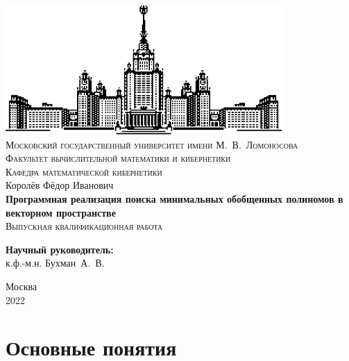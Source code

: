 \documentclass[a4paper,12pt,titlepage]{article}
\begin{document}
\hypersetup{pageanchor=false}
\begin{titlepage}
    \begin{center}
        \includegraphics{logo.pdf} \\
        \textsc{\small Московский государственный университет имени М.~В.~Ломоносова \\
        Факультет вычислительной математики и кибернетики \\
        Кафедра математической кибернетики \\}
        \vfill
        \large{Королёв Фёдор Иванович} \\
        \vspace{1cm}
        \textbf{\large Программная реализация поиска минимальных обобщенных полиномов в векторном пространстве} \\
        \vfill
        \textsc{\large Выпускная квалификационная работа} \\
    \end{center}
    \begin{flushright}
        \vfill
        \textbf{Научный руководитель:} \\
        к.ф.-м.н. Бухман~А.~В.
    \end{flushright}
    \begin{center}
        \vfill
        {\small Москва \\
        2022}
    \end{center}
\end{titlepage}

\hypersetup{pageanchor=true}
\tableofcontents
\newpage

\section{Основные понятия}
\end{document}
